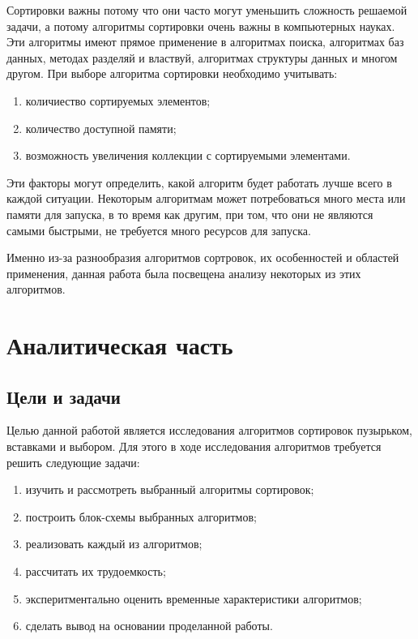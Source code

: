 \documentclass[a4paper,12pt]{report}
\begin{document}
Сортировки важны потому что они часто могут уменьшить сложность решаемой задачи, а потому алгоритмы сортировки очень важны в компьютерных науках. Эти алгоритмы имеют прямое применение в алгоритмах поиска, алгоритмах баз данных, методах разделяй и властвуй, алгоритмах структуры данных и многом другом.\newline\newline
При выборе алгоритма сортировки необходимо учитывать: 
\begin{enumerate}
	\item количиество сортируемых элементов;
	\item количество доступной памяти;
	\item возможность увеличения коллекции с сортируемыми элементами.
\end{enumerate}
  

Эти факторы могут определить, какой алгоритм будет работать лучше всего в каждой ситуации. Некоторым алгоритмам может потребоваться много места или памяти для запуска, в то время как другим, при том, что они не являются самыми быстрыми, не требуется много ресурсов для запуска.

Именно из-за разнообразия алгоритмов сортровок, их особенностей и областей применения, данная работа была посвещена анализу некоторых из этих алгоритмов.
	
	
	

	
	\chapter{Аналитическая часть}
	
	\section{Цели и задачи}
	
	Целью данной работой является исследования алгоритмов сортировок пузырьком, вставками и выбором. Для этого в ходе исследования алгоритмов требуется решить следующие задачи:
	\begin{enumerate}
		\item изучить и рассмотреть выбранный алгоритмы сортировок;
		\item построить блок-схемы выбранных алгоритмов;
		\item реализовать каждый из алгоритмов;
		\item рассчитать их трудоемкость;
		\item эксперитментально оценить временные характеристики алгоритмов;
		\item сделать вывод на основании проделанной работы.
	\end{enumerate}
	
\end{document}
